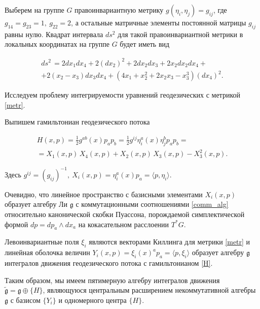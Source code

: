 Выберем на группе $G$ правоинвариантную метрику $g(\eta_i,\eta_j)=g_{ij}$, где $ g_{14}=g_{23}=1,\ g_{22}=2$, а остальные матричные элементы постоянной матрицы $ g_{ij} $ равны нулю. Квадрат интервала $ds^2$ для такой правоинвариантной метрики в локальных координатах на группе $ G $ будет иметь вид

\begin{multline}\label{metr}

ds^2\,=2dx_1dx_4+2(dx_2)^2+2dx_2dx_3+2x_2dx_2dx_4 +\\ +2(x_2-x_3)dx_3dx_4

+(4x_1+x_{2}^{2}+2x_2 x_3-x_{3}^{3})(d x_4)^2.

\end{multline}



Исследуем проблему интегрируемости уравнений геодезических с метрикой \eqref{metr}.



Выпишем гамильтониан геодезического потока 

\begin{multline}\label{H}

H(x,p)=\frac12 g^{ab}(x)p_ap_b=\frac12g^{ij}\eta_i^a(x)\eta_j^bp_ap_b= \\ 

=X_1(x,p)\,X_4(x,p)+X_2(x,p)\,X_3(x,p)-X_3^2(x,p).

\end{multline}

Здесь $ g^{ij}=(g_{ij})^{-1},\ X_i(x,p)=\eta_i^a(x)p_a=\langle p,\eta_i\rangle $.



Очевидно, что линейное пространство с базисными элементами $ X_i(x,p) $ образует алгебру Ли $ \mathfrak{g} $ с коммутационными соотношениями \eqref{comm_alg} относительно канонической скобки Пуассона, порождаемой симплектической формой $ dp=dp_a\wedge dx_a $ на кокасательном расслоении $ T^*G $.



Левоинвариантные поля $ \xi_i $ являются векторами Киллинга для метрики \eqref{metr} и линейная оболочка величин $ Y_i(x,p)=\xi_i(x)^ap_a=\langle p,\xi_i\rangle$ образует алгебру $\mathfrak{g}$ интегралов движения геодезического потока с гамильтонианом \eqref{H}. 

Таким образом, мы имеем пятимерную алгебру интегралов движения $ \tilde{\mathfrak{g}}=\mathfrak{g}\oplus \{H\}$, являющуюся центральным расширением некоммутативной алгебры $ \mathfrak{g} $ с базисом $ \{Y_i\} $ и одномерного центра $ \{H\} $. 

